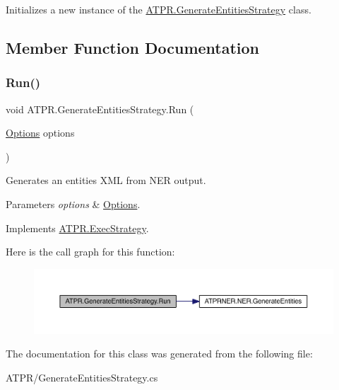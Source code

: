 Initializes a new instance of the \hyperlink{class_a_t_p_r_1_1_generate_entities_strategy}{A\+T\+P\+R.\+Generate\+Entities\+Strategy} class. 



\subsection{Member Function Documentation}
\hypertarget{class_a_t_p_r_1_1_generate_entities_strategy_a05c83e5d9d7ea2b05f4de5dab1a87f06}{}\label{class_a_t_p_r_1_1_generate_entities_strategy_a05c83e5d9d7ea2b05f4de5dab1a87f06} 
\subsubsection{\texorpdfstring{Run()}{Run()}}
{\footnotesize\ttfamily void A\+T\+P\+R.\+Generate\+Entities\+Strategy.\+Run (\begin{DoxyParamCaption}\item[{\hyperlink{class_a_t_p_r_1_1_options}{Options}}]{options }\end{DoxyParamCaption})\hspace{0.3cm}{\ttfamily [inline]}}



Generates an entities X\+ML from N\+ER output. 


\begin{DoxyParams}{Parameters}
{\em options} & \hyperlink{class_a_t_p_r_1_1_options}{Options}.\\
\hline
\end{DoxyParams}


Implements \hyperlink{interface_a_t_p_r_1_1_exec_strategy}{A\+T\+P\+R.\+Exec\+Strategy}.

Here is the call graph for this function\+:
\nopagebreak
\begin{figure}[H]
\begin{center}
\leavevmode
\includegraphics[width=350pt]{de/d99/class_a_t_p_r_1_1_generate_entities_strategy_a05c83e5d9d7ea2b05f4de5dab1a87f06_cgraph}
\end{center}
\end{figure}


The documentation for this class was generated from the following file\+:\begin{DoxyCompactItemize}
\item 
A\+T\+P\+R/Generate\+Entities\+Strategy.\+cs\end{DoxyCompactItemize}
